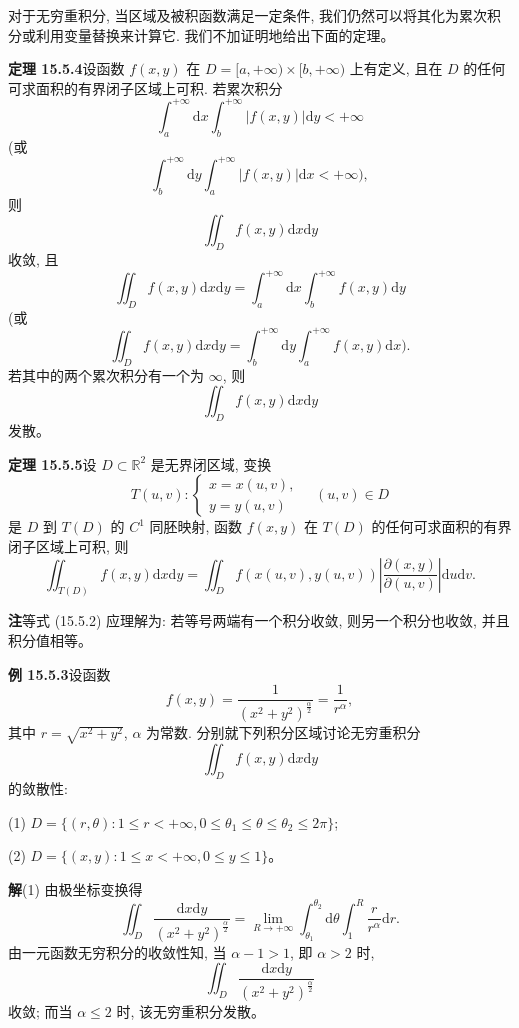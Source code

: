 \documentclass[UTF8, 12pt, fontset=fandol, oneside]{ctexart}
\begin{document}
对于无穷重积分, 当区域及被积函数满足一定条件, 我们仍然可以将其化为累次积分或利用变量替换来计算它. 我们不加证明地给出下面的定理。

\noindent\textbf{定理 15.5.4}\quad 设函数 $f(x,y)$ 在 $D=[a,+\infty)\times[b,+\infty)$ 上有定义, 且在 $D$ 的任何可求面积的有界闭子区域上可积. 若累次积分
\[
  \int_a^{+\infty}\mathrm dx\int_b^{+\infty}|f(x,y)|\mathrm dy<+\infty
\]
(或
\[
  \int_b^{+\infty}\mathrm dy\int_a^{+\infty}|f(x,y)|\mathrm dx<+\infty),
\]
则
\[
  \iint_D f(x,y)\mathrm dx\mathrm dy
\]
收敛, 且
\[
  \iint_D f(x,y)\mathrm dx\mathrm dy
  =\int_a^{+\infty}\mathrm dx\int_b^{+\infty}f(x,y)\mathrm dy
\]
(或
\[
  \iint_D f(x,y)\mathrm dx\mathrm dy
  =\int_b^{+\infty}\mathrm dy\int_a^{+\infty}f(x,y)\mathrm dx).
\]
若其中的两个累次积分有一个为 $\infty$, 则
\[
  \iint_D f(x,y)\mathrm dx\mathrm dy
\]
发散。

\noindent\textbf{定理 15.5.5}\quad 设 $D\subset\mathbb R^2$ 是无界闭区域, 变换
\[
  T(u,v):
  \begin{cases}
    x=x(u,v),\\
    y=y(u,v)
  \end{cases}
  \quad (u,v)\in D
\]
是 $D$ 到 $T(D)$ 的 $C^1$ 同胚映射, 函数 $f(x,y)$ 在 $T(D)$ 的任何可求面积的有界闭子区域上可积, 则
\begin{equation}
  \iint_{T(D)}f(x,y)\mathrm dx\mathrm dy
  =\iint_D f(x(u,v),y(u,v))
  \left|\frac{\partial(x,y)}{\partial(u,v)}\right|\mathrm du\mathrm dv.
  \tag{15.5.2}
\end{equation}

\noindent\textbf{注}\quad 等式 (15.5.2) 应理解为: 若等号两端有一个积分收敛, 则另一个积分也收敛, 并且积分值相等。

\noindent\textbf{例 15.5.3}\quad 设函数
\[
  f(x,y)=\frac1{(x^2+y^2)^{\frac\alpha2}}=\frac1{r^\alpha},
\]
其中 $r=\sqrt{x^2+y^2}$, $\alpha$ 为常数. 分别就下列积分区域讨论无穷重积分
\[
  \iint_D f(x,y)\mathrm dx\mathrm dy
\]
的敛散性:

(1) $D=\{(r,\theta):1\leqslant r<+\infty,0\leqslant\theta_1\leqslant\theta\leqslant\theta_2\leqslant2\pi\}$;

(2) $D=\{(x,y):1\leqslant x<+\infty,0\leqslant y\leqslant1\}$。

\noindent\textbf{解}\quad (1) 由极坐标变换得
\[
  \iint_D\frac{\mathrm dx\mathrm dy}{(x^2+y^2)^{\frac\alpha2}}
  =\lim_{R\to+\infty}\int_{\theta_1}^{\theta_2}\mathrm d\theta
  \int_1^R\frac r{r^\alpha}\mathrm dr.
\]
由一元函数无穷积分的收敛性知, 当 $\alpha-1>1$, 即 $\alpha>2$ 时,
\[
  \iint_D\frac{\mathrm dx\mathrm dy}{(x^2+y^2)^{\frac\alpha2}}
\]
收敛; 而当 $\alpha\leqslant2$ 时, 该无穷重积分发散。
\end{document}
